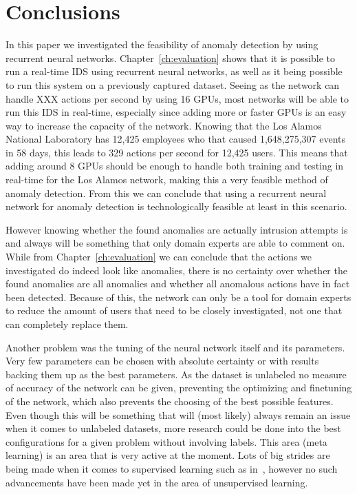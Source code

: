 \chapter{Conclusions}\label{ch:conclusions}

In this paper we investigated the feasibility of anomaly detection by using recurrent neural networks. Chapter~\ref{ch:evaluation} shows that it is possible to run a real-time IDS using recurrent neural networks, as well as it being possible to run this system on a previously captured dataset. Seeing as the network can handle XXX actions per second by using 16 GPUs, most networks will be able to run this IDS in real-time, especially since adding more or faster GPUs is an easy way to increase the capacity of the network. Knowing that the Los Alamos National Laboratory has 12,425 employees who that caused 1,648,275,307 events in 58 days, this leads to 329 actions per second for 12,425 users. This means that adding around 8 GPUs should be enough to handle both training and testing in real-time for the Los Alamos network, making this a very feasible method of anomaly detection. From this we can conclude that using a recurrent neural network for anomaly detection is technologically feasible at least in this scenario. 

However knowing whether the found anomalies are actually intrusion attempts is and always will be something that only domain experts are able to comment on. While from Chapter~\ref{ch:evaluation} we can conclude that the actions we investigated do indeed look like anomalies, there is no certainty over whether the found anomalies are all anomalies and whether all anomalous actions have in fact been detected. Because of this, the network can only be a tool for domain experts to reduce the amount of users that need to be closely investigated, not one that can completely replace them. 

Another problem was the tuning of the neural network itself and its parameters. Very few parameters can be chosen with absolute certainty or with results backing them up as the best parameters. As the dataset is unlabeled no measure of accuracy of the network can be given, preventing the optimizing and finetuning of the network, which also prevents the choosing of the best possible features. Even though this will be something that will (most likely) always remain an issue when it comes to unlabeled datasets, more research could be done into the best configurations for a given problem without involving labels. This area (meta learning) is an area that is very active at the moment. Lots of big strides are being made when it comes to supervised learning such as in~\cite{zoph2016neural}, however no such advancements have been made yet in the area of unsupervised learning.
